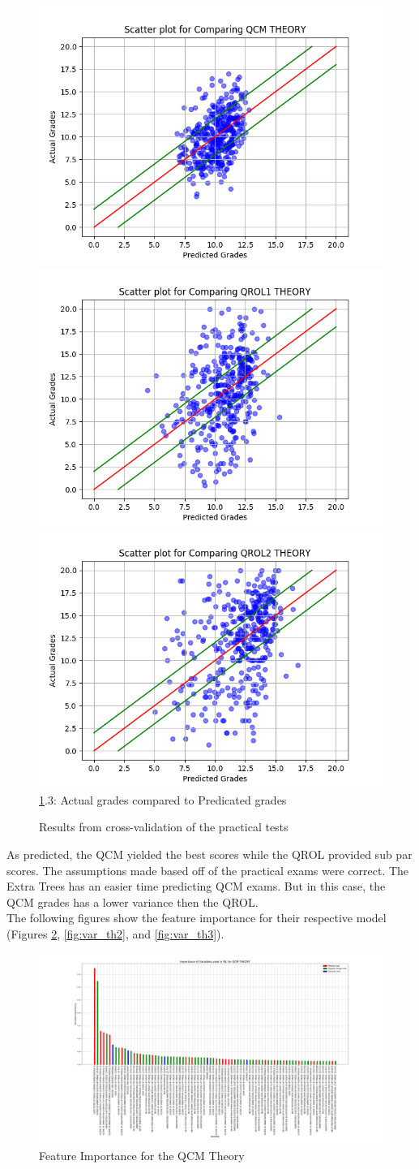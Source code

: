\documentclass[a4paper,11pt]{report}
\numberwithin{figure}{section} %
\begin{document}
\begin{figure}[H]
      \includegraphics[width=.30\linewidth]{plots/cv_comp_QCM_THEORY_2018-04-30_13_57_05.png}
      \includegraphics[width=.30\linewidth]{plots/cv_comp_QROL1_THEORY_2018-04-30_13_40_50.png}
  	  \includegraphics[width=.30\linewidth]{plots/cv_comp_QROL2_THEORY_2018-04-30_13_12_52.png}
      \\
      \ref{fig:results_theo}.3: Actual grades compared to Predicated grades
      \caption{Results from cross-validation of the practical tests}
      \label{fig:results_theo}
    \end{figure}
    
    As predicted, the QCM yielded the best scores while the QROL provided sub par scores.
    The assumptions made based off of the practical exams were correct.
    The Extra Trees has an easier time predicting QCM exams.
    But in this case, the QCM grades has a lower variance then the QROL.\\


    The following figures show the feature importance for their respective model (Figures \ref{fig:var_th1}, \ref{fig:var_th2}, and \ref{fig:var_th3}).

     \begin{figure}[H]
      \centering
      \includegraphics[width=.95\linewidth]{plots/var_importance_QCM_THEORY_2018-05-02_20_53_18.png}
      \caption{Feature Importance for the QCM Theory}
      \label{fig:var_th1}
      \end{figure}
      
\end{document}
